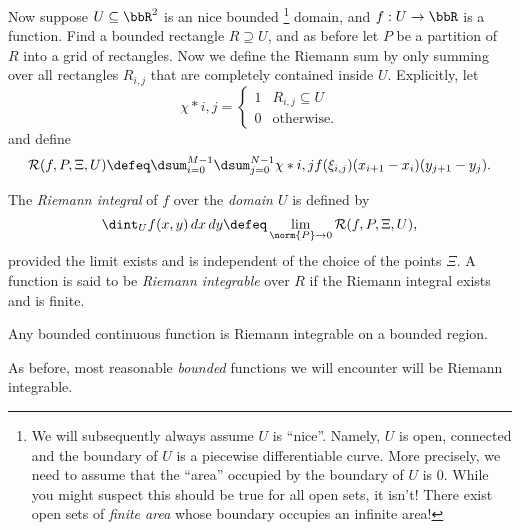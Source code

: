   Now suppose $U \subseteq \bbR^2$ is an nice bounded%
  \footnote{%
    We will subsequently always assume $U$ is ``nice''. Namely, $U$ is open, 
connected and the boundary of $U$ is a piecewise differentiable curve.
    More precisely, we need to assume that the ``area'' occupied by the boundary 
of $U$ is $0$.
    While you might suspect this should be true for all open sets, it isn't!
    There exist open sets of \emph{finite area} whose boundary occupies an 
infinite area!}
  domain, and $f:U \to \bbR$ is a function.
  Find a bounded rectangle $R \supseteq U$, and as before let $P$ be a partition 
of $R$ into a grid of rectangles.
  Now we define the Riemann sum by only summing over all rectangles $R_{i,j}$ 
that are completely contained inside $U$.
  Explicitly, let
  \begin{equation*}
    \chi*{i,j}
      = \begin{cases}
	  1 & R_{i,j} \subseteq U\\
	  0 & \text{otherwise}.
	\end{cases}
  \end{equation*}
  and define
  \begin{equation*}
    \mathcal R(f, P, \Xi, U)
      \defeq \dsum_{i=0}^{M-1} \dsum_{j = 0}^{N-1} \chi*{i,j}
	f(\xi_{i, j}) (x_{i+1} - x_i) (y_{j+1} - y_j).
  \end{equation*}
  \begin{definition}
    The \emph{Riemann integral} of $f$ over the \emph{domain $U$} is defined by
    \begin{equation*}
      \dint_U f(x, y) \, dx \, dy
      \defeq
      \lim_{\norm{P} \to 0}
	\mathcal R( f, P, \Xi, U ),
    \end{equation*}
    provided the limit exists and is independent of the choice of the points 
$\Xi$.
    A function is said to be \emph{Riemann integrable} over $R$ if the Riemann 
integral exists and is finite.
  \end{definition}

  \begin{theorem}
    Any bounded continuous function is Riemann integrable on a bounded region.
  \end{theorem}
  \begin{remark}
    As before, most reasonable \emph{bounded} functions we will encounter will 
be Riemann integrable.
  \end{remark}

